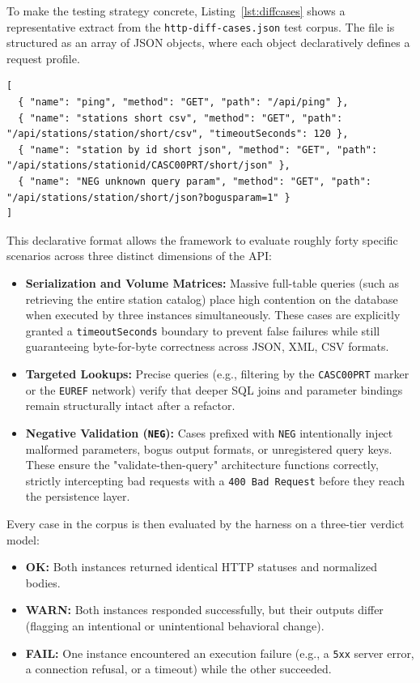 To make the testing strategy concrete, Listing~\ref{lst:diffcases} shows a representative
extract from the \texttt{http-diff-cases.json} test corpus. The file is structured
as an array of \ac{JSON} objects, where each object declaratively defines a request
profile.

\begin{lstlisting}[caption={Representative extract of the \texttt{http-diff-cases.json} test corpus.}, label={lst:diffcases}]
[
  { "name": "ping", "method": "GET", "path": "/api/ping" },
  { "name": "stations short csv", "method": "GET", "path": "/api/stations/station/short/csv", "timeoutSeconds": 120 },
  { "name": "station by id short json", "method": "GET", "path": "/api/stations/stationid/CASC00PRT/short/json" },
  { "name": "NEG unknown query param", "method": "GET", "path": "/api/stations/station/short/json?bogusparam=1" }
]
\end{lstlisting}

This declarative format allows the framework to evaluate roughly forty
specific scenarios across three distinct dimensions of the \ac{API}:
\begin{itemize}
	\item \textbf{Serialization and Volume Matrices:} Massive full-table
		queries (such as retrieving the entire station catalog) place high
		contention on the database when executed by three instances
		simultaneously. These cases are explicitly granted a \texttt{timeoutSeconds}
		boundary to prevent false failures while still guaranteeing byte-for-byte
		correctness across \ac{JSON}, \ac{XML}, \ac{CSV} formats.

	\item \textbf{Targeted Lookups:} Precise queries (e.g., filtering by the \texttt{CASC00PRT}
		marker or the \texttt{EUREF} network) verify that deeper \ac{SQL} joins and
		parameter bindings remain structurally intact after a refactor.

	\item \textbf{Negative Validation (\texttt{NEG}):} Cases prefixed with
		\texttt{NEG} intentionally inject malformed parameters, bogus output
		formats, or unregistered query keys. These ensure the "validate-then-query"
		architecture functions correctly, strictly intercepting bad requests with
		a \texttt{400 Bad Request} before they reach the persistence layer.
\end{itemize}

Every case in the corpus is then evaluated by the harness on a three-tier verdict
model:
\begin{itemize}
	\item \textbf{OK:} Both instances returned identical \ac{HTTP} statuses and
		normalized bodies.

	\item \textbf{WARN:} Both instances responded successfully, but their outputs
		differ (flagging an intentional or unintentional behavioral change).

	\item \textbf{FAIL:} One instance encountered an execution failure (e.g., a
		\texttt{5xx} server error, a connection refusal, or a timeout) while the
		other succeeded.
\end{itemize}

